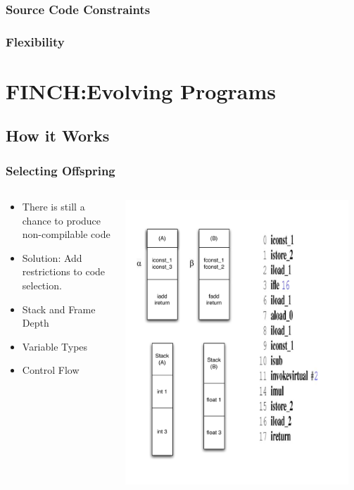 \documentclass{beamer}
\begin{document}
\begin{frame}
	\frametitle{Source Code Constraints}
\end{frame}

\begin{frame}
	\frametitle{Flexibility}
\end{frame}

\section[FINCH]{FINCH:Evolving Programs}

\subsection[How it works]{How it Works}
\begin{frame}
  \frametitle{Selecting Offspring}
  
  \begin{columns}
  \begin{column}{0.6\textwidth}
  \begin{itemize}
  	\item There is still a chance to produce non-compilable code
	\item Solution: Add restrictions to code selection.
	\item Stack and Frame Depth
	\item Variable Types
	\item Control Flow
  \end{itemize}
  \end{column}
  \begin{column}{0.4\textwidth}
	  \includegraphics[width=0.95\textwidth]{talk.pdf}
  \end{column}
	  

\end{columns}
\end{frame}
\end{document}
